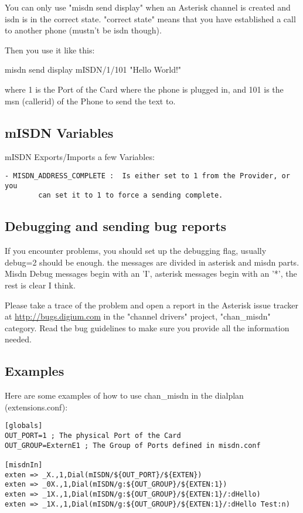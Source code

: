 You can only use "misdn send display" when an Asterisk channel is created and
isdn is in the correct state. "correct state" means that you have established a
call to another phone (mustn't be isdn though).

Then you use it like this:

misdn send display mISDN/1/101 "Hello World!"

where 1 is the Port of the Card where the phone is plugged in, and 101 is the
msn (callerid) of the Phone to send the text to.

\subsection{mISDN Variables}

mISDN Exports/Imports a few Variables: 

\begin{verbatim}
- MISDN_ADDRESS_COMPLETE :  Is either set to 1 from the Provider, or you 
        can set it to 1 to force a sending complete.
\end{verbatim}


\subsection{Debugging and sending bug reports}

If you encounter problems, you should set up the debugging flag, usually
debug=2 should be enough. the messages are divided in asterisk and misdn
parts.  Misdn Debug messages begin with an 'I', asterisk messages begin with
an '*', the rest is clear I think.

Please take a trace of the problem and open a report in the Asterisk issue
tracker at \url{http://bugs.digium.com} in the "channel drivers" project,
"chan\_misdn" category. Read the bug guidelines to make sure you
provide all the information needed.


\subsection{Examples}

Here are some examples of how to use chan\_misdn in the dialplan
(extensions.conf):

\begin{verbatim}
[globals]
OUT_PORT=1 ; The physical Port of the Card
OUT_GROUP=ExternE1 ; The Group of Ports defined in misdn.conf

[misdnIn]
exten => _X.,1,Dial(mISDN/${OUT_PORT}/${EXTEN})
exten => _0X.,1,Dial(mISDN/g:${OUT_GROUP}/${EXTEN:1})
exten => _1X.,1,Dial(mISDN/g:${OUT_GROUP}/${EXTEN:1}/:dHello)
exten => _1X.,1,Dial(mISDN/g:${OUT_GROUP}/${EXTEN:1}/:dHello Test:n)
\end{verbatim}

